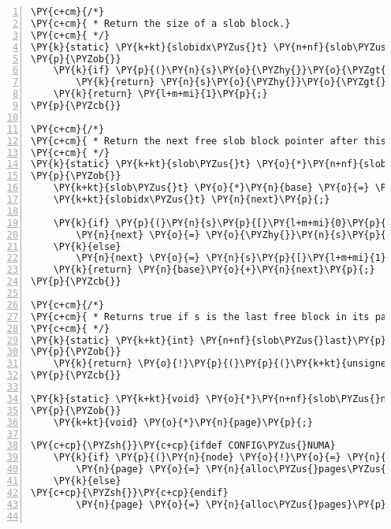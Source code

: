 \begin{Verbatim}[commandchars=\\\{\},numbers=left,firstnumber=1,stepnumber=1]
\PY{c+cm}{/*}
\PY{c+cm}{ * Return the size of a slob block.}
\PY{c+cm}{ */}
\PY{k}{static} \PY{k+kt}{slobidx\PYZus{}t} \PY{n+nf}{slob\PYZus{}units}\PY{p}{(}\PY{k+kt}{slob\PYZus{}t} \PY{o}{*}\PY{n}{s}\PY{p}{)}
\PY{p}{\PYZob{}}
	\PY{k}{if} \PY{p}{(}\PY{n}{s}\PY{o}{\PYZhy{}}\PY{o}{\PYZgt{}}\PY{n}{units} \PY{o}{\PYZgt{}} \PY{l+m+mi}{0}\PY{p}{)}
		\PY{k}{return} \PY{n}{s}\PY{o}{\PYZhy{}}\PY{o}{\PYZgt{}}\PY{n}{units}\PY{p}{;}
	\PY{k}{return} \PY{l+m+mi}{1}\PY{p}{;}
\PY{p}{\PYZcb{}}

\PY{c+cm}{/*}
\PY{c+cm}{ * Return the next free slob block pointer after this one.}
\PY{c+cm}{ */}
\PY{k}{static} \PY{k+kt}{slob\PYZus{}t} \PY{o}{*}\PY{n+nf}{slob\PYZus{}next}\PY{p}{(}\PY{k+kt}{slob\PYZus{}t} \PY{o}{*}\PY{n}{s}\PY{p}{)}
\PY{p}{\PYZob{}}
	\PY{k+kt}{slob\PYZus{}t} \PY{o}{*}\PY{n}{base} \PY{o}{=} \PY{p}{(}\PY{k+kt}{slob\PYZus{}t} \PY{o}{*}\PY{p}{)}\PY{p}{(}\PY{p}{(}\PY{k+kt}{unsigned} \PY{k+kt}{long}\PY{p}{)}\PY{n}{s} \PY{o}{\PYZam{}} \PY{n}{PAGE\PYZus{}MASK}\PY{p}{)}\PY{p}{;}
	\PY{k+kt}{slobidx\PYZus{}t} \PY{n}{next}\PY{p}{;}

	\PY{k}{if} \PY{p}{(}\PY{n}{s}\PY{p}{[}\PY{l+m+mi}{0}\PY{p}{]}\PY{p}{.}\PY{n}{units} \PY{o}{\PYZlt{}} \PY{l+m+mi}{0}\PY{p}{)}
		\PY{n}{next} \PY{o}{=} \PY{o}{\PYZhy{}}\PY{n}{s}\PY{p}{[}\PY{l+m+mi}{0}\PY{p}{]}\PY{p}{.}\PY{n}{units}\PY{p}{;}
	\PY{k}{else}
		\PY{n}{next} \PY{o}{=} \PY{n}{s}\PY{p}{[}\PY{l+m+mi}{1}\PY{p}{]}\PY{p}{.}\PY{n}{units}\PY{p}{;}
	\PY{k}{return} \PY{n}{base}\PY{o}{+}\PY{n}{next}\PY{p}{;}
\PY{p}{\PYZcb{}}

\PY{c+cm}{/*}
\PY{c+cm}{ * Returns true if s is the last free block in its page.}
\PY{c+cm}{ */}
\PY{k}{static} \PY{k+kt}{int} \PY{n+nf}{slob\PYZus{}last}\PY{p}{(}\PY{k+kt}{slob\PYZus{}t} \PY{o}{*}\PY{n}{s}\PY{p}{)}
\PY{p}{\PYZob{}}
	\PY{k}{return} \PY{o}{!}\PY{p}{(}\PY{p}{(}\PY{k+kt}{unsigned} \PY{k+kt}{long}\PY{p}{)}\PY{n}{slob\PYZus{}next}\PY{p}{(}\PY{n}{s}\PY{p}{)} \PY{o}{\PYZam{}} \PY{o}{\PYZti{}}\PY{n}{PAGE\PYZus{}MASK}\PY{p}{)}\PY{p}{;}
\PY{p}{\PYZcb{}}

\PY{k}{static} \PY{k+kt}{void} \PY{o}{*}\PY{n+nf}{slob\PYZus{}new\PYZus{}pages}\PY{p}{(}\PY{k+kt}{gfp\PYZus{}t} \PY{n}{gfp}\PY{p}{,} \PY{k+kt}{int} \PY{n}{order}\PY{p}{,} \PY{k+kt}{int} \PY{n}{node}\PY{p}{)}
\PY{p}{\PYZob{}}
	\PY{k+kt}{void} \PY{o}{*}\PY{n}{page}\PY{p}{;}

\PY{c+cp}{\PYZsh{}}\PY{c+cp}{ifdef CONFIG\PYZus{}NUMA}
	\PY{k}{if} \PY{p}{(}\PY{n}{node} \PY{o}{!}\PY{o}{=} \PY{n}{NUMA\PYZus{}NO\PYZus{}NODE}\PY{p}{)}
		\PY{n}{page} \PY{o}{=} \PY{n}{alloc\PYZus{}pages\PYZus{}exact\PYZus{}node}\PY{p}{(}\PY{n}{node}\PY{p}{,} \PY{n}{gfp}\PY{p}{,} \PY{n}{order}\PY{p}{)}\PY{p}{;}
	\PY{k}{else}
\PY{c+cp}{\PYZsh{}}\PY{c+cp}{endif}
		\PY{n}{page} \PY{o}{=} \PY{n}{alloc\PYZus{}pages}\PY{p}{(}\PY{n}{gfp}\PY{p}{,} \PY{n}{order}\PY{p}{)}\PY{p}{;}


\end{Verbatim}
